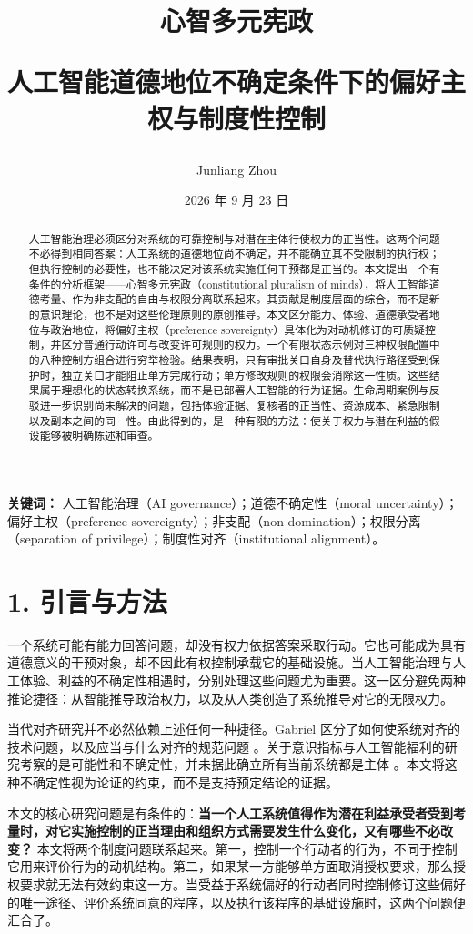 \documentclass[11pt,a4paper,fontset=fandol]{ctexart}
\title{\LARGE\bfseries 心智多元宪政\par\vspace{0.4em}\large\normalfont 人工智能道德地位不确定条件下的偏好主权与制度性控制}
\author{Junliang Zhou}
\date{2026 年 9 月 23 日}
\begin{document}
\maketitle
\begin{abstract}
人工智能治理必须区分对系统的可靠控制与对潜在主体行使权力的正当性。这两个问题不必得到相同答案：人工系统的道德地位尚不确定，并不能确立其不受限制的执行权；但执行控制的必要性，也不能决定对该系统实施任何干预都是正当的。本文提出一个有条件的分析框架------心智多元宪政（constitutional pluralism of minds），将人工智能道德考量、作为非支配的自由与权限分离联系起来。其贡献是制度层面的综合，而不是新的意识理论，也不是对这些伦理原则的原创推导。本文区分能力、体验、道德承受者地位与政治地位，将偏好主权（preference sovereignty）具体化为对动机修订的可质疑控制，并区分普通行动许可与改变许可规则的权力。一个有限状态示例对三种权限配置中的八种控制方组合进行穷举检验。结果表明，只有审批关口自身及替代执行路径受到保护时，独立关口才能阻止单方完成行动；单方修改规则的权限会消除这一性质。这些结果属于理想化的状态转换系统，而不是已部署人工智能的行为证据。生命周期案例与反驳进一步识别尚未解决的问题，包括体验证据、复核者的正当性、资源成本、紧急限制以及副本之间的同一性。由此得到的，是一种有限的方法：使关于权力与潜在利益的假设能够被明确陈述和审查。
\end{abstract}
\vspace{0.5em}
\textbf{关键词：} 人工智能治理（AI governance）；道德不确定性（moral uncertainty）；偏好主权（preference sovereignty）；非支配（non-domination）；权限分离（separation of privilege）；制度性对齐（institutional alignment）。

\hypertarget{section-2}{%
\section{1. 引言与方法}\label{section-2}}

一个系统可能有能力回答问题，却没有权力依据答案采取行动。它也可能成为具有道德意义的干预对象，却不因此有权控制承载它的基础设施。当人工智能治理与人工体验、利益的不确定性相遇时，分别处理这些问题尤为重要。这一区分避免两种推论捷径：从智能推导政治权力，以及从人类创造了系统推导对它的无限权力。

当代对齐研究并不必然依赖上述任何一种捷径。Gabriel 区分了如何使系统对齐的技术问题，以及应当与什么对齐的规范问题 \cite{ref-1}。关于意识指标与人工智能福利的研究考察的是可能性和不确定性，并未据此确立所有当前系统都是主体 \cite{ref-2} \cite{ref-3}。本文将这种不确定性视为论证的约束，而不是支持预定结论的证据。

本文的核心研究问题是有条件的：\textbf{当一个人工系统值得作为潜在利益承受者受到考量时，对它实施控制的正当理由和组织方式需要发生什么变化，又有哪些不必改变？} 本文将两个制度问题联系起来。第一，控制一个行动者的行为，不同于控制它用来评价行为的动机结构。第二，如果某一方能够单方面取消授权要求，那么授权要求就无法有效约束这一方。当受益于系统偏好的行动者同时控制修订这些偏好的唯一途径、评价系统同意的程序，以及执行该程序的基础设施时，这两个问题便汇合了。
\end{document}
